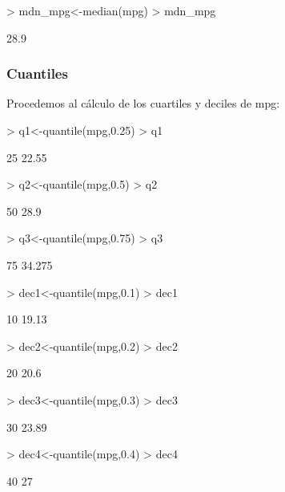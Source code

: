 \documentclass [a4paper] {article}
\begin{document}
\begin{Schunk}
\begin{Sinput}
> mdn_mpg<-median(mpg)
> mdn_mpg
\end{Sinput}
\begin{Soutput}
[1] 28.9
\end{Soutput}
\end{Schunk}

\subsubsection{Cuantiles}
Procedemos al cálculo de los cuartiles y deciles de mpg:

\begin{Schunk}
\begin{Sinput}
> q1<-quantile(mpg,0.25)
> q1 
\end{Sinput}
\begin{Soutput}
  25%
22.55 
\end{Soutput}
\begin{Sinput}
> q2<-quantile(mpg,0.5)
> q2
\end{Sinput}
\begin{Soutput}
 50%
28.9 
\end{Soutput}
\begin{Sinput}
> q3<-quantile(mpg,0.75)
> q3 
\end{Sinput}
\begin{Soutput}
   75%
34.275 
\end{Soutput}
\begin{Sinput}
> dec1<-quantile(mpg,0.1)
> dec1
\end{Sinput}
\begin{Soutput}
  10%
19.13 
\end{Soutput}
\begin{Sinput}
> dec2<-quantile(mpg,0.2)
> dec2
\end{Sinput}
\begin{Soutput}
 20%
20.6 
\end{Soutput}
\begin{Sinput}
> dec3<-quantile(mpg,0.3)
> dec3
\end{Sinput}
\begin{Soutput}
  30%
23.89 
\end{Soutput}
\begin{Sinput}
> dec4<-quantile(mpg,0.4)
> dec4
\end{Sinput}
\begin{Soutput}
40%
 27 
\end{Soutput}
\begin{Sinput}

\end{Sinput}
\end{Schunk}
\end{document}
